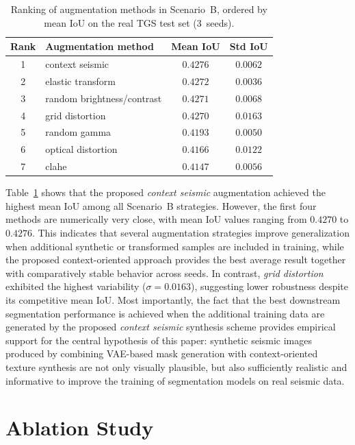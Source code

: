\documentclass{ieeeaccess}
\begin{document}
\begin{table}[htbp]
    \centering
    \caption{Ranking of augmentation methods in Scenario~B, ordered by mean IoU on the real TGS test set (3~seeds).}
    \label{tab:downstream_augments}
    \footnotesize
    \begin{tabular}{clcc}
        \toprule
        \textbf{Rank} & \textbf{Augmentation method} & \textbf{Mean IoU} & \textbf{Std IoU} \\
        \midrule
        1 & context seismic & $\mathbf{0.4276}$ & $0.0062$ \\
        2 & elastic transform & $0.4272$ & $0.0036$ \\
        3 & random brightness/contrast & $0.4271$ & $0.0068$ \\
        4 & grid distortion & $0.4270$ & $0.0163$ \\
        5 & random gamma & $0.4193$ & $0.0050$ \\
        6 & optical distortion & $0.4166$ & $0.0122$ \\
        7 & clahe & $0.4147$ & $0.0056$ \\
        \bottomrule
    \end{tabular}
\end{table}

Table~\ref{tab:downstream_augments} shows that the proposed \emph{context seismic} augmentation achieved the highest mean IoU among all Scenario~B strategies. However, the first four methods are numerically very close, with mean IoU values ranging from $0.4270$ to $0.4276$. This indicates that several augmentation strategies improve generalization when additional synthetic or transformed samples are included in training, while the proposed context-oriented approach provides the best average result together with comparatively stable behavior across seeds. In contrast, \emph{grid distortion} exhibited the highest variability ($\sigma = 0.0163$), suggesting lower robustness despite its competitive mean IoU. Most importantly, the fact that the best downstream segmentation performance is achieved when the additional training data are generated by the proposed \emph{context seismic} synthesis scheme provides empirical support for the central hypothesis of this paper: synthetic seismic images produced by combining VAE-based mask generation with context-oriented texture synthesis are not only visually plausible, but also sufficiently realistic and informative to improve the training of segmentation models on real seismic data.

\section{Ablation Study}
\label{sec:ablation}
\end{document}
